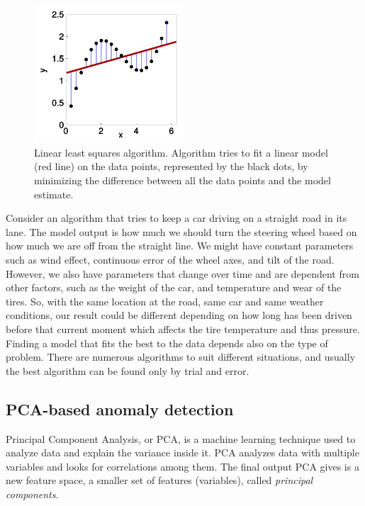 \begin{figure}[htb]
    \centering
    \includegraphics[width=0.5\textwidth]{./appendices/linear-regression}
    \caption{Linear least squares algorithm.
    Algorithm tries to fit a linear model (red line) on the data points,
        represented by the black dots,
        by minimizing the difference between all the data points
        and the model estimate.~\cite{stulp2015many}
        \label{fig:linear-regression-example}}
\end{figure}

Consider an algorithm that tries to keep a car
driving on a straight road in its lane.
The model output is how much we should turn the steering wheel
based on how much we are off from the straight line.
We might have constant parameters such as
wind effect, continuous error of the wheel axes, and tilt of the road.
However,
we also have parameters that change over time
and are dependent from other factors,
such as the weight of the car,
and temperature and wear of the tires.
So, with the same location at the road,
same car and same weather conditions,
our result could be different
depending on how long has been driven before that current moment
which affects the tire temperature and thus pressure.
Finding a model that fits the best to the data
depends also on the type of problem.
There are numerous algorithms to suit different situations,
and usually the best algorithm can be found
only by trial and error.



\subsection{PCA-based anomaly detection}\label{subsec:bg-pca-ada}

Principal Component Analysis, or PCA,
is a machine learning technique
used to analyze data and explain the variance inside it.
PCA analyzes data with multiple variables
and looks for correlations among them.
The final output PCA gives
is a new feature space,
\ie a smaller set of features (variables),
called \textit{principal components}.~\cite{azure2022pca}

